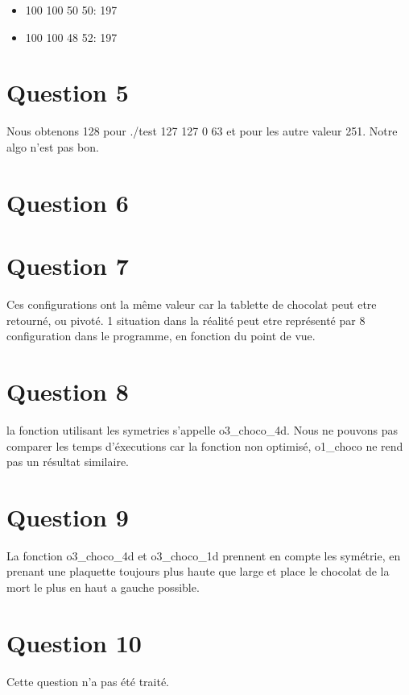 \documentclass[a4paper,12pt]{report}
\begin{document}
\begin{itemize}
	\item 100 100 50 50: 197
	\item 100 100 48 52: 197
\end{itemize}

\newpage

\section*{Question 5}
Nous obtenons 128 pour ./test 127 127 0 63 et pour les autre valeur 251. Notre algo n'est pas bon.


\section*{Question 6}


\section*{Question 7}
Ces configurations ont la même valeur car la tablette de chocolat peut etre retourné, ou pivoté. 1 situation dans la réalité peut etre représenté par 8 configuration dans le programme, en fonction du point de vue.

\section*{Question 8}

la fonction utilisant les symetries s'appelle o3_choco_4d. Nous ne pouvons pas comparer les temps d'éxecutions car la fonction non optimisé, o1_choco ne rend pas un résultat similaire.


\section*{Question 9}

La fonction o3_choco_4d et o3_choco_1d prennent en compte les symétrie, en prenant une plaquette toujours plus haute que large et place le chocolat de la mort le plus en haut a gauche possible.

\section*{Question 10}
Cette question n'a pas été traité.
\end{document}
